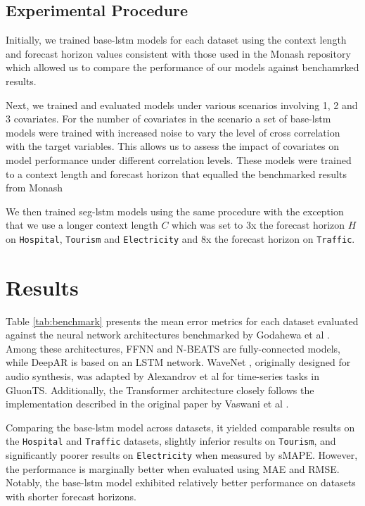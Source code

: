 \documentclass[letterpaper]{article}
\newcommand{\horizon}{H}
\newcommand{\contextlength}{C}
\begin{document}
\subsection{Experimental Procedure}
Initially, we trained base-lstm models for each dataset using the context length and forecast horizon values consistent with 
those used in the Monash repository which allowed us to compare the performance of our models 
against benchamrked results. 

Next, we trained and evaluated models under various scenarios involving 1, 2 and 3 
covariates. For the number of covariates in the scenario a set of base-lstm models were trained with increased noise to vary the 
level of cross correlation with the target variables.  This allows us to assess the impact of covariates on model performance under 
different correlation levels. These models were trained to a context length and forecast horizon that equalled the benchmarked 
results from Monash \cite{DBLP:conf/nips/GodahewaBWHM21}

We then trained seg-lstm models using the same procedure with the exception that we use a longer context 
length $\contextlength$ which was set to 3x the forecast horizon $\horizon$ on \texttt{Hospital}, \texttt{Tourism} and \texttt{Electricity} and 8x the forecast horizon on \texttt{Traffic}. 

\section{Results}
Table \ref{tab:benchmark} presents the mean error metrics for each dataset evaluated against the neural network architectures benchmarked 
by Godahewa et al \cite{DBLP:conf/nips/GodahewaBWHM21}. Among these architectures, FFNN and N-BEATS \cite{oreshkin2020nbeats} are fully-connected models, 
while DeepAR \cite{salinas2019deepar} is based on an LSTM network. WaveNet \cite{oord2016wavenet}, originally designed for 
audio synthesis, was adapted by Alexandrov et al \cite{gluonts_arxiv} for time-series tasks in GluonTS. Additionally, the Transformer 
architecture closely follows the implementation described in the original paper by Vaswani et al \cite{vaswani2023attention}.

Comparing the base-lstm model across datasets, it yielded comparable results on the \texttt{Hospital} and \texttt{Traffic} datasets, 
slightly inferior results on \texttt{Tourism}, and significantly poorer results on \texttt{Electricity} when measured by sMAPE. However, 
the performance is marginally better when evaluated using MAE and RMSE. Notably, the base-lstm model exhibited relatively better performance on datasets with shorter forecast horizons.
\end{document}
